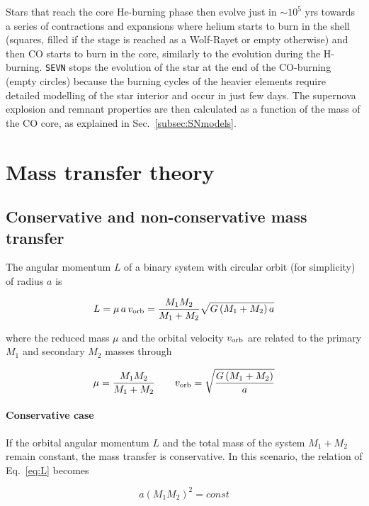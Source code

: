 \documentclass[a4paper,titlepage]{book}     	%
\begin{document}
Stars that reach the core He-burning phase then evolve just in $\sim 10^{5}$ yrs towards a series of contractions and expansions where helium starts to burn in the shell (squares, filled if the stage is reached as a Wolf-Rayet or empty otherwise) and then CO starts to burn in the core, similarly to the evolution during the H-burning. \texttt{SEVN} stops the evolution of the star at the end of the CO-burning (empty circles) because the burning cycles of the heavier elements require detailed modelling of the star interior and occur in just few days. The supernova explosion and remnant properties are then calculated as a function of the mass of the CO core, as explained in Sec.\ \ref{subsec:SNmodels}.



\section{Mass transfer theory}\label{subsec:masstransfer}
\subsection{Conservative and non-conservative mass transfer}\label{subsec:conservativeMT}
The angular momentum $L$ of a binary system with circular orbit (for simplicity) of radius $a$ is

\begin{equation}\label{eq:L}
L = \mu\,a\,v_\textup{orb} = \frac{M_1 M_2}{M_1 + M_2} \sqrt{G \left(M_1 + M_2\right) a}
\end{equation}

where the reduced mass $\mu$ and the orbital velocity $v_{\rm orb}$ are related to the primary $M_1$ and secondary $M_2$ masses through

\begin{equation}\label{eq:mu_vorb}
\mu = \frac{M_1 M_2}{M_1 + M_2} \quad \quad  v_\textup{orb}=\sqrt{\frac{G \left(M_1+M_2\right)}{a}} 
\end{equation}

\paragraph{Conservative case} If the orbital angular momentum $L$ and the total mass of the system $M_1 + M_2$ remain constant, the mass transfer is conservative. In this scenario, the relation of Eq.\ \ref{eq:L} becomes

\begin{equation}\label{eq:a_const}
a \left(M_1M_2\right)^2 = const
\end{equation}
\end{document}
